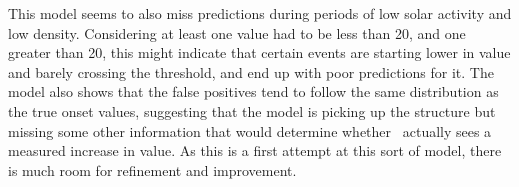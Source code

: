 This model seems to also miss predictions during periods of low solar activity and low density. Considering at least one value had to be less than 20, and one greater than 20, this might indicate that certain events are starting lower in value and barely crossing the threshold, and end up with poor predictions for it.  The model also shows that the false positives tend to follow the same distribution as the true onset values, suggesting that the model is picking up the structure but missing some other information that would determine whether \req\ actually sees a measured increase in value. As this is a first attempt at this sort of model, there is much room for refinement and improvement.


